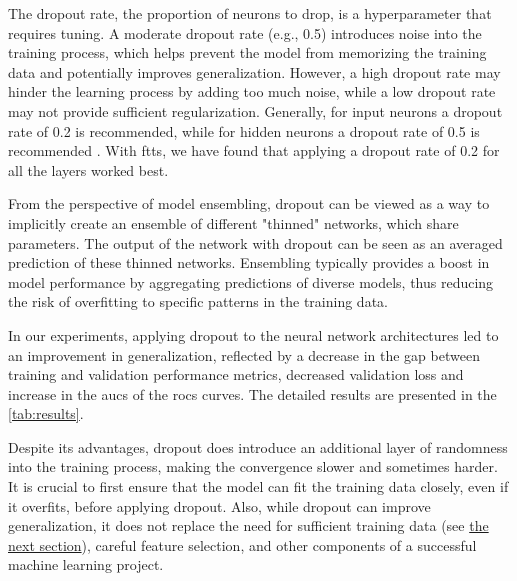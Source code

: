The dropout rate, the proportion of neurons to drop, is a hyperparameter that requires tuning. A moderate dropout rate
(e.g., 0.5) introduces noise into the training process, which helps prevent the model from memorizing the training data
and potentially improves generalization. However, a high dropout rate may hinder the learning process by adding too much
noise, while a low dropout rate may not provide sufficient regularization. Generally, for input neurons a dropout rate
of 0.2 is recommended, while for hidden neurons a dropout rate of 0.5 is recommended \cite{dropout}. With \glspl{ftt},
we have found that applying a dropout rate of 0.2 for all the layers worked best.

From the perspective of model ensembling, dropout can be viewed as a way to implicitly create an ensemble of different
"thinned" networks, which share parameters. The output of the network with dropout can be seen as an averaged prediction
of these thinned networks. Ensembling typically provides a boost in model performance by aggregating predictions of
diverse models, thus reducing the risk of overfitting to specific patterns in the training data.


In our experiments, applying dropout to the neural network architectures led to an improvement in generalization,
reflected by a decrease in the gap between training and validation performance metrics, decreased validation loss and
increase in the \glspl{auc} of the \glspl{roc} curves. The detailed results are presented in the \autoref{tab:results}.

Despite its advantages, dropout does introduce an additional layer of randomness into the training process, making the
convergence slower and sometimes harder. It is crucial to first ensure that the model can fit the training data closely,
even if it overfits, before applying dropout. Also, while dropout can improve generalization, it does not replace the
need for sufficient training data (see \hyperref[sec:extended-set]{the next section}), careful feature selection, and other
components of a successful machine learning project.











